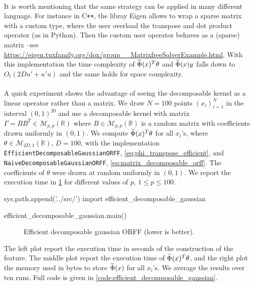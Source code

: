 \paragraph{}
It is worth mentioning that the same strategy can be applied in many different language. For instance in C{}\verb!++!, the libray Eigen \cite{eigenweb} allows to wrap a sparse matrix with a custom type, where the user overload the transpose and dot product operator (as in Python). Then the custom user operator behaves as a (sparse) matrix --see \url{https://eigen.tuxfamily.org/dox/group__MatrixfreeSolverExample.html}. With this implementation the time complexity of $\widetilde{\Phi}(x)^T\theta$ and $\widetilde{\Phi}(x)y$ falls down to $O_t(2Du'+u'u)$ and the same holds for space complexity.
\paragraph{}
A quick experiment shows the advantage of seeing the decomposable kernel as a linear operator rather than a matrix. We draw $N=100$ points $(x_i)_{i=1}^N$ in the interval $(0,1)^{20}$ and use a decomposable kernel with matrix $\Gamma=BB^T\in\mathcal{M}_{p,p}(\mathbb{R})$ where $B\in\mathcal{M}_{p,p}(\mathbb{R})$ is a random matrix with coefficients drawn uniformly in $(0,1)$. We compute $\widetilde{\Phi}(x)^T\theta$ for all $x_i$'s, where $\theta\in\mathcal{M}_{2D,1}(\mathbb{R})$, $D=100$, with the implementation \texttt{Ef\-fi\-cient\-De\-com\-po\-sa\-ble\-Gaus\-sian\-ORFF}, \cref{eq:phi_transpose_efficient}, and \texttt{Na\-ive\-De\-com\-po\-sa\-ble\-Gaus\-sian\-ORFF}, \cref{eq:matrix_decomposable_orff}. The coefficients of $\theta$ were drawn at random uniformly in $(0,1)$. We report the execution time in \cref{fig:efficient_decomposable_gaussian} for different values of $p$, $1\le p\le100$.
\begin{pycode}
sys.path.append('../src/')
import efficient_decomposable_gaussian

efficient_decomposable_gaussian.main()
\end{pycode}
\begin{figure}[htb]
\caption[Efficient decomposable gaussian \acs{ORFF}]{Efficient decomposable gaussian ORFF (lower is better).}
\label{fig:efficient_decomposable_gaussian}
\end{figure}
The left plot report the execution time in seconds of the construction of the feature. The middle plot report the execution time of $\widetilde{\Phi}(x)^T\theta$, and the right plot the memory used in bytes  to store $\widetilde{\Phi}(x)$ for all $x_i$'s. We average the results over ten runs. Full code is given in \cref{code:efficient_decomposable_gaussian}.


